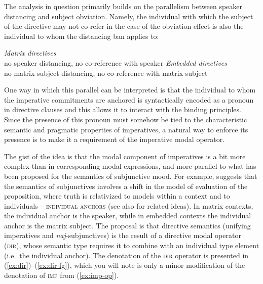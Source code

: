 \documentclass[output=paper,colorlinks,citecolor=brown]{langscibook}
\begin{document}
The analysis in question primarily builds on the parallelism between speaker distancing and subject obviation. Namely, the individual with which the subject of the directive may not co-refer in the case of the obviation effect is also the individual to whom the distancing ban applies to: 

\ea \ea \emph{Matrix directives}\\ no speaker distancing, no co-reference with speaker
    \ex \emph{Embedded directives}\\ no matrix subject distancing, no co-reference with matrix subject
\z\z 

\noindent One way in which this parallel can be interpreted is that the individual to whom the imperative commitments are anchored is syntactically encoded as a pronoun in directive clauses and this allows it to interact with the binding principles. Since the presence of this pronoun must somehow be tied to the characteristic semantic and pragmatic properties of imperatives, a natural way to enforce its presence is to make it a requirement of the imperative modal operator.

The gist of the idea is that the modal component of imperatives is a bit more complex than in corresponding modal expressions, and more parallel to what has been proposed for the semantics of subjunctive mood. For example, \textcite{quer98,quer01} suggests that the semantics of subjunctives involves a shift in the model of evaluation of the proposition, where truth is relativized to models within a context and to individuals -- \textsc{individual anchors} (see also \cite{farkas92b,giannakidou98} for related ideas). In matrix contexts, the individual anchor is the speaker, while in embedded contexts the individual anchor is the matrix subject. The proposal is that directive semantics (unifying imperatives and \emph{naj}-subjunctives) is the result of a directive modal operator (\textsc{dir}), whose semantic type requires it to combine with an individual type element (i.e.\ the individual anchor). The denotation of the \textsc{dir} operator is presented in (\ref{ex:dir})--(\ref{ex:dir-fg}), which you will note is only a minor modification of the denotation of \textsc{imp} from (\ref{ex:imp-op}). 
\end{document}
